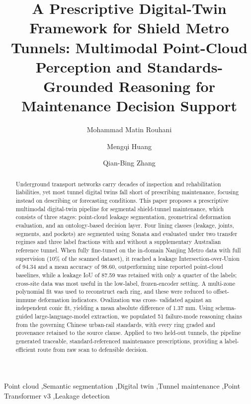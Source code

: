 \documentclass[preprint,12pt,authoryear]{elsarticle}
\begin{document}
\begin{frontmatter}

\title{A Prescriptive Digital-Twin Framework for Shield Metro Tunnels: Multimodal Point-Cloud Perception and Standards-Grounded Reasoning for Maintenance Decision Support}

\author[monash]{Mohammad Matin Rouhani}
\author[swinburne]{Mengqi Huang}
\author[monash]{Qian-Bing Zhang}


\begin{abstract}
Underground transport networks carry decades of inspection and rehabilitation liabilities, yet 
most tunnel digital twins fall short of prescribing maintenance, focusing instead on describing 
or forecasting conditions. This paper proposes a prescriptive multimodal digital-twin pipeline 
for segmental shield-tunnel maintenance, which consists of three stages: point-cloud leakage 
segmentation, geometrical deformation evaluation, and an ontology-based decision layer. Four 
lining classes (leakage, joints, segments, and pockets) are segmented using Sonata and evaluated 
under two transfer regimes and three label fractions with and without a supplementary Australian 
reference tunnel. When fully fine-tuned on the in-domain Nanjing Metro data with full 
supervision (10\% of the scanned dataset), it reached a leakage Intersection-over-Union of 94.34 
and a mean accuracy of 98.60, outperforming nine reported point-cloud baselines, while a leakage 
IoU of 87.59 was retained with only a quarter of the labels; cross-site data was most useful in 
the low-label, frozen-encoder setting. A multi-zone polynomial fit was used to reconstruct each 
ring, and these were reduced to offset-immune deformation indicators. Ovalization was cross-
validated against an independent conic fit, yielding a mean absolute difference of 1.37 mm. 
Using schema-guided large-language-model extraction, we populated 51 failure-mode reasoning 
chains from the governing Chinese urban-rail standards, with every ring graded and provenance 
retained to the source clause. Applied to two held-out tunnels, the pipeline generated 
traceable, standard-referenced maintenance prescriptions, providing a label-efficient route from 
raw scan to defensible decision.
\end{abstract}

\begin{keyword}
Point cloud \sep Semantic segmentation \sep Digital twin \sep Tunnel maintenance \sep Point Transformer v3 \sep Leakage detection
\end{keyword}

\end{frontmatter}
\end{document}
